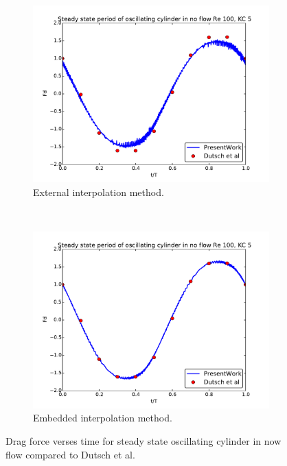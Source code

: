 \begin{figure}[!htb]
	\centering
	\begin{subfigure}{0.4\textwidth}
		\includegraphics[width=\linewidth]{staticexss}
		\caption{External interpolation method.}
	\end{subfigure}
	~
	\begin{subfigure}{0.4\textwidth}
		\includegraphics[width=\linewidth]{staticemss}
		\caption{Embedded interpolation method.}
	\end{subfigure}
	\caption{Drag force verses time for steady state oscillating cylinder in now flow compared to Dutsch et al.~\cite{dutsch1998low}}
	\label{fig:static2}
\end{figure}

